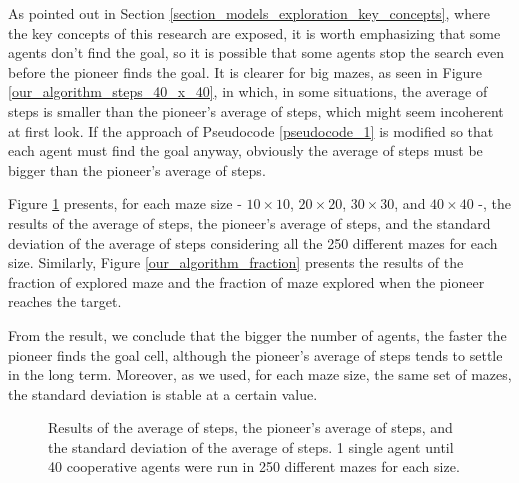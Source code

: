 As pointed out in Section \ref{section_models_exploration_key_concepts}, where the key concepts of this research are exposed, it is worth emphasizing that some agents don't find the goal, so it is possible that some agents stop the search even before the pioneer finds the goal. It is clearer for big mazes, as seen in Figure \ref{our_algorithm_steps_40_x_40}, in which, in some situations, the average of steps is smaller than the pioneer's average of steps, which might seem incoherent at first look. If the approach of Pseudocode \ref{pseudocode_1} is modified so that each agent must find the goal anyway, obviously the average of steps must be bigger than the pioneer's average of steps.

Figure \ref{our_algorithm_steps} presents, for each maze size - $10 \times 10$, $20 \times 20$, $30 \times 30$, and $40 \times 40$ -, the results of the average of steps, the pioneer's average of steps, and the standard deviation of the average of steps considering all the 250 different mazes for each size. Similarly, Figure \ref{our_algorithm_fraction} presents the results of the fraction of explored maze and the fraction of maze explored when the pioneer reaches the target.

From the result, we conclude that the bigger the number of agents, the faster the pioneer finds the goal cell, although the pioneer's average of steps tends to settle in the long term. Moreover, as we used, for each maze size, the same set of mazes, the standard deviation is stable at a certain value. 

\begin{figure}
    \centering
    \qquad
    \qquad
    \newline
    \qquad
    \caption{Results of the average of steps, the pioneer's average of steps, and the standard deviation of the average of steps. 1 single agent until 40 cooperative agents were run in 250 different mazes for each size.}
    \label{our_algorithm_steps}
\end{figure}

